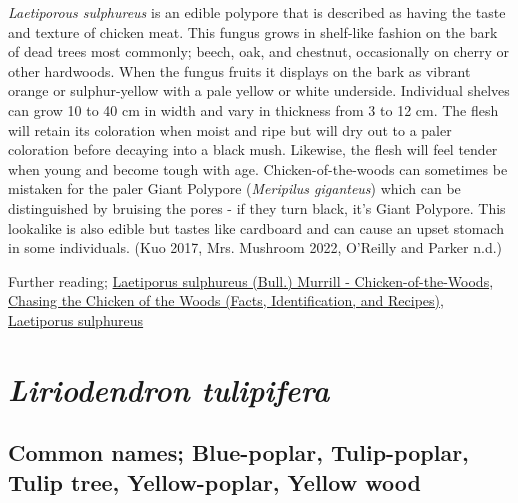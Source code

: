 \documentclass[
]{article}
\begin{document}
\emph{Laetiporous sulphureus} is an edible polypore that is described as having the taste and texture of chicken meat. This fungus grows in shelf-like fashion on the bark of dead trees most commonly; beech, oak, and chestnut, occasionally on cherry or other hardwoods. When the fungus fruits it displays on the bark as vibrant orange or sulphur-yellow with a pale yellow or white underside. Individual shelves can grow 10 to 40 cm in width and vary in thickness from 3 to 12 cm. The flesh will retain its coloration when moist and ripe but will dry out to a paler coloration before decaying into a black mush. Likewise, the flesh will feel tender when young and become tough with age. Chicken-of-the-woods can sometimes be mistaken for the paler Giant Polypore (\emph{Meripilus giganteus}) which can be distinguished by bruising the pores - if they turn black, it's Giant Polypore. This lookalike is also edible but tastes like cardboard and can cause an upset stomach in some individuals. (Kuo 2017, Mrs. Mushroom 2022, O'Reilly and Parker n.d.)

Further reading; \href{https://www.first-nature.com/fungi/laetiporus-sulphureus.php}{Laetiporus sulphureus (Bull.) Murrill - Chicken-of-the-Woods}, \href{https://www.mushroom-appreciation.com/chicken-of-the-woods.html}{Chasing the Chicken of the Woods (Facts, Identification, and Recipes)},
\href{https://www.mushroomexpert.com/laetiporus_sulphureus.html}{Laetiporus sulphureus}

\hypertarget{liriodendron-tulipifera}{%
\section{\texorpdfstring{\emph{Liriodendron tulipifera}}{Liriodendron tulipifera}}\label{liriodendron-tulipifera}}

\hypertarget{common-names-blue-poplar-tulip-poplar-tulip-tree-yellow-poplar-yellow-wood}{%
\subsection{Common names; Blue-poplar, Tulip-poplar, Tulip tree, Yellow-poplar, Yellow wood}\label{common-names-blue-poplar-tulip-poplar-tulip-tree-yellow-poplar-yellow-wood}}
\end{document}
